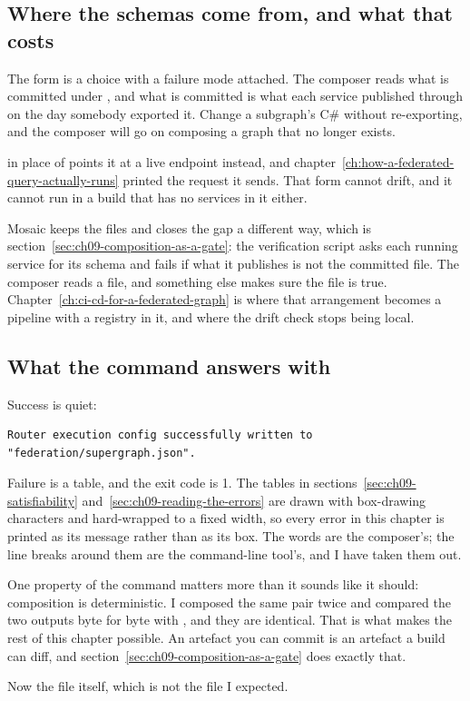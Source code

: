 \subsection*{Where the schemas come from, and what that costs}

%
The  form is a choice with a failure mode attached. The composer
reads what is committed under , and what is committed is what each
service published through  on the day somebody exported it.
Change a subgraph's C\# without re-exporting, and the composer will go on
composing a graph that no longer exists.

 in place of  points it at a live endpoint
instead, and chapter~\ref{ch:how-a-federated-query-actually-runs} printed the
request it sends. That form cannot drift, and it cannot run in a build that has
no services in it either.

Mosaic keeps the files and closes the gap a different way, which is
section~\ref{sec:ch09-composition-as-a-gate}: the verification script asks each
running service for its schema and fails if what it publishes is not the
committed file. The composer reads a file, and something else makes sure the
file is true. Chapter~\ref{ch:ci-cd-for-a-federated-graph} is where that
arrangement becomes a pipeline with a registry in it, and where the drift check
stops being local.

\subsection*{What the command answers with}

Success is quiet:

\begin{verbatim}
Router execution config successfully written to "federation/supergraph.json".
\end{verbatim}

Failure is a table, and the exit code is 1. The tables in
sections~\ref{sec:ch09-satisfiability} and~\ref{sec:ch09-reading-the-errors} are
drawn with box-drawing characters and hard-wrapped to a fixed width, so every
error in this chapter is printed as its message rather than as its box. The
words are the composer's; the line breaks around them are the command-line
tool's, and I have taken them out.

%
One property of the command matters more than it sounds like it should:
composition is deterministic. I composed the same pair twice and compared the
two outputs byte for byte with , and they are identical. That is what
makes the rest of this chapter possible. An artefact you can commit is an
artefact a build can diff, and section~\ref{sec:ch09-composition-as-a-gate} does
exactly that.

Now the file itself, which is not the file I expected.

%

